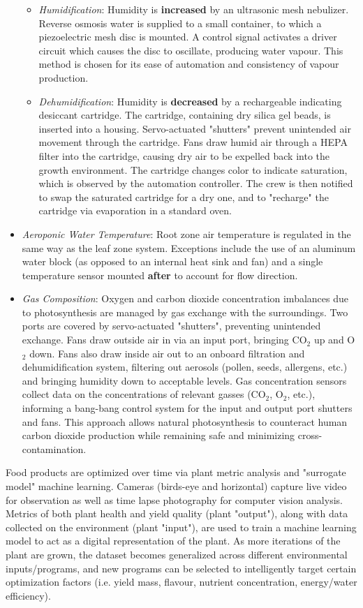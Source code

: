 \documentclass{report}
\begin{document}
\begin{itemize}
\begin{itemize}
        \item \textit{Humidification}: Humidity is \textbf{increased} by an ultrasonic mesh nebulizer. Reverse osmosis water is supplied to a small container, to which a piezoelectric mesh disc is mounted. A control signal activates a driver circuit which causes the disc to oscillate, producing water vapour. This method is chosen for its ease of automation and consistency of vapour production.
        \item \textit{Dehumidification}: Humidity is \textbf{decreased} by a rechargeable indicating desiccant cartridge. The cartridge, containing dry silica gel beads, is inserted into a housing. Servo-actuated "shutters" prevent unintended air movement through the cartridge. Fans draw humid air through a HEPA filter into the cartridge, causing dry air to be expelled back into the growth environment. The cartridge changes color to indicate saturation, which is observed by the automation controller. The crew is then notified to swap the saturated cartridge for a dry one, and to "recharge" the cartridge via evaporation in a standard oven.
    \end{itemize}
    \item \textit{Aeroponic Water Temperature}: Root zone air temperature is regulated in the same way as the leaf zone system. Exceptions include the use of an aluminum water block (as opposed to an internal heat sink and fan) and a single temperature sensor mounted \textbf{after} to account for flow direction.
    \item \textit{Gas Composition}: Oxygen and carbon dioxide concentration imbalances due to photosynthesis are managed by gas exchange with the surroundings. Two ports are covered by servo-actuated "shutters", preventing unintended exchange. Fans draw outside air in via an input port, bringing CO${}_2$ up and O${}_2$ down. Fans also draw inside air out to an onboard filtration and dehumidification system, filtering out aerosols (pollen, seeds, allergens, etc.) and bringing humidity down to acceptable levels. Gas concentration sensors collect data on the concentrations of relevant gasses (CO${}_2$, O${}_2$, etc.), informing a bang-bang control system for the input and output port shutters and fans. This approach allows natural photosynthesis to counteract human carbon dioxide production while remaining safe and minimizing cross-contamination.
\end{itemize}

Food products are optimized over time via plant metric analysis and "surrogate model" machine learning. Cameras (birds-eye and horizontal) capture live video for observation as well as time lapse photography for computer vision analysis. Metrics of both plant health and yield quality (plant "output"), along with data collected on the environment (plant "input"), are used to train a machine learning model to act as a digital representation of the plant. As more iterations of the plant are grown, the dataset becomes generalized across different environmental inputs/programs, and new programs can be selected to intelligently target certain optimization factors (i.e. yield mass, flavour, nutrient concentration, energy/water efficiency).
\end{document}
